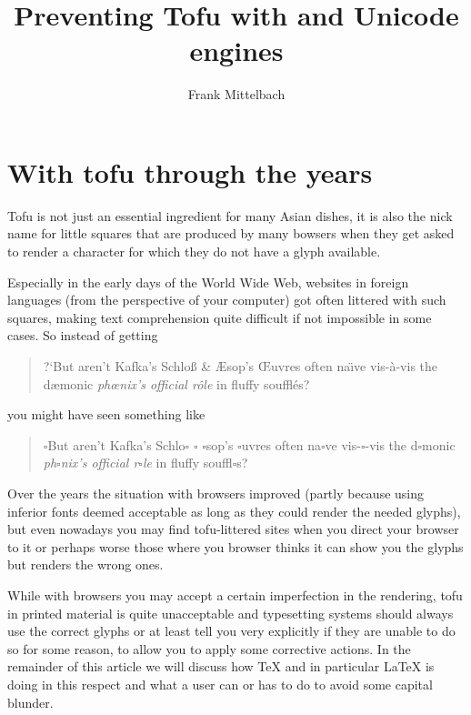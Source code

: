 \documentclass{ltugboat}
\author{Frank Mittelbach}
\title{Preventing Tofu with \pdfTeX{} and Unicode engines}
\newcommand\tofu{$\square$}
\begin{document}
\maketitle

\begin{abstract}

\end{abstract}

\tableofcontents

\section{With tofu through the years}

Tofu is not just an essential ingredient for many Asian dishes, it is
also the nick name for little squares that are produced by many
bowsers when they get asked to render a character for which they do
not have a glyph available.

Especially in the early days of the World Wide Web,
websites in foreign languages (from the perspective of your computer)
got often littered with such squares, making text comprehension quite
difficult if not impossible in some cases. So instead of getting
\begin{quote}
  ?`But aren't Kafka's Schlo{\ss} \&
  {\AE}sop's {\OE}uvres often na{\"\i}ve vis-\`{a}-vis the d{\ae}monic
  \textit{ph{\oe}nix's official r\^{o}le} in fluffy souffl\'{e}s?
\end{quote}
you might have seen something like
\begin{quote}
  \tofu But aren't Kafka's Schlo{\tofu} \tofu{} {\tofu}sop's
  \tofu{}uvres often na{\tofu}ve vis-\tofu{}-vis the d{\tofu}monic
  \textit{ph{\tofu}nix's official r\tofu{}le} in fluffy
  souffl\tofu{}s?
\end{quote}
Over the years the situation with browsers improved (partly because
using inferior fonts deemed acceptable as long as they could render
the needed glyphs), but even nowadays you may find tofu-littered sites
when you direct your browser to it or perhaps worse those where you
browser thinks it can show you the glyphs but renders the wrong ones.

While with browsers you may accept a certain imperfection in the
rendering, tofu in printed material is quite unacceptable and
typesetting systems should always use the correct glyphs or at least
tell you very explicitly if they are unable to do so for some reason,
to allow you to apply some corrective actions. In the remainder of
this article we will discuss how \TeX{} and in particular \LaTeX{} is
doing in this respect and what a user can or has to do to avoid some
capital blunder.
\end{document}

